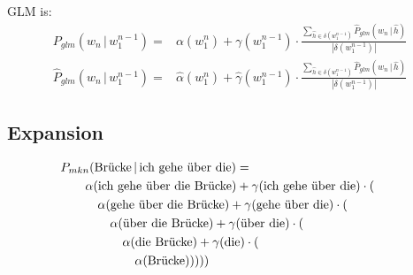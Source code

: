 \documentclass[11pt,a4paper]{article}
\newcommand\givenbase[1][]{\,#1\lvert\,}
\let\given\givenbase
\newcommand{\cardinality}[1]{|#1|}
\newcommand{\probSymbol}[1][]{P_{#1}}
\newcommand{\prob}[2][]{\probSymbol[#1](#2)}
\newcommand{\probCond}[3][]{\prob[#1]{#2 \given #3}}
\newcommand{\probSymbolLower}[1][]{\hat{P}_{#1}}
\newcommand{\probLower}[2][]{\probSymbolLower[#1](#2)}
\newcommand{\probCondLower}[3][]{\probLower[#1]{#2 \given #3}}
\begin{document}
GLM is:
\begin{align}
  \probCond[glm]{w_n}{w_1^{n-1}}      =& \alpha(w_1^n) + \gamma(w_1^{n-1}) \cdot \frac{\sum_{\hat h \in \delta(w_1^{n-1})} \probCondLower[glm]{w_n}{\hat h}}{\cardinality{\delta(w_1^{n-1})}} \\
  \probCondLower[glm]{w_n}{w_1^{n-1}} =& \hat\alpha(w_1^n) + \hat\gamma(w_1^{n-1}) \cdot \frac{\sum_{\hat h \in \delta(w_1^{n-1})} \probCondLower[glm]{w_n}{\hat h}}{\cardinality{\delta(w_1^{n-1})}}
\end{align}

\subsection{Expansion}


\begin{equation}
  \begin{split}
    &\hspace{-2em}\probCond[mkn]{\text{Br\"ucke}}{\text{ich gehe \"uber die}} = \\
      &\alpha(\text{ich gehe \"uber die Br\"ucke}) + \gamma(\text{ich gehe \"uber die}) \cdot (\\
        &\quad \alpha(\text{gehe \"uber die Br\"ucke}) + \gamma(\text{gehe \"uber die}) \cdot (\\
          &\quad\quad \alpha(\text{\"uber die Br\"ucke}) + \gamma(\text{\"uber die}) \cdot (\\
            &\quad\quad\quad \alpha(\text{die Br\"ucke}) + \gamma(\text{die}) \cdot (\\
              &\quad\quad\quad\quad \alpha(\text{Br\"ucke})))))
  \end{split}
\end{equation}
\end{document}
